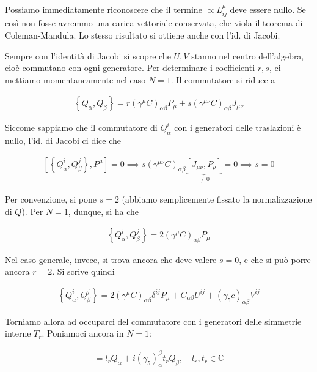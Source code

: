 \documentclass{report}
\begin{document}
Possiamo immediatamente riconoscere che il termine \(\propto L^\mu_{ij}\) deve essere nullo. Se così non fosse avremmo una carica vettoriale conservata, che viola il teorema di Coleman-Mandula. Lo stesso risultato si ottiene anche con l'id. di Jacobi. 

Sempre con l'identità di Jacobi si scopre che \(U, V\) stanno nel centro dell'algebra, cioè commutano con ogni generatore. Per determinare i coefficienti \(r, s\), ci mettiamo momentaneamente nel caso \(N=1\). Il commutatore si riduce a 

\begin{align}
     \left\{Q_\alpha, Q_\beta\right\} =  r(\gamma^\mu C)_{\alpha\beta}P_\mu  + s(\gamma^{\mu\nu}C)_{\alpha\beta}J_{\mu\nu}
\end{align}

Siccome sappiamo che il commutatore di \(Q^i_\alpha\) con i generatori delle traslazioni è nullo, l'id. di Jacobi ci dice che 

\begin{align}
    \left[\left\{Q_\alpha^i, Q_\beta^j \right\}, P^\mu \right] = 0 \implies s(\gamma^{\mu\nu}C)_{\alpha\beta}\underbrace{[J_{\mu\nu}, P_\rho]}_{\neq 0} = 0 \implies s = 0
\end{align}

Per convenzione, si pone \(s=2\) (abbiamo semplicemente fissato la normalizzazione di \(Q\)). Per \(N=1\), dunque, si ha che 

\begin{align}
    \left\{Q_\alpha^i, Q_\beta^j \right\} = 2 (\gamma^\mu C)_{\alpha\beta}P_\mu
\end{align}

Nel caso generale, invece, si trova ancora che deve valere \(s=0\), e che si può porre ancora \(r = 2\). Si scrive quindi 

\begin{align}
    \left\{Q_\alpha^i, Q_\beta^j \right\} = 2 (\gamma^\mu C)_{\alpha\beta}\delta^{ij}P_\mu+ C_{\alpha\beta}U^{ij} + (\gamma_5 c)_{\alpha\beta}V^{ij}
\end{align}

Torniamo allora ad occuparci del commutatore con i generatori delle simmetrie interne \(T_r\). Poniamoci ancora in \(N=1\): 

\begin{align}
    [Q_\alpha, T_r] = l_r Q_\alpha + i (\gamma_5)^\beta_\alpha t_r Q_\beta, \quad l_r, t_r \in \mathbb{C}
\end{align}
\end{document}
